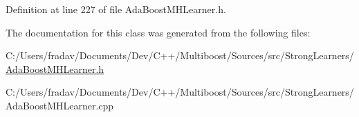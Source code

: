 Definition at line 227 of file Ada\-Boost\-M\-H\-Learner.\-h.



The documentation for this class was generated from the following files\-:\begin{DoxyCompactItemize}
\item 
C\-:/\-Users/fradav/\-Documents/\-Dev/\-C++/\-Multiboost/\-Sources/src/\-Strong\-Learners/\hyperlink{AdaBoostMHLearner_8h}{Ada\-Boost\-M\-H\-Learner.\-h}\item 
C\-:/\-Users/fradav/\-Documents/\-Dev/\-C++/\-Multiboost/\-Sources/src/\-Strong\-Learners/Ada\-Boost\-M\-H\-Learner.\-cpp\end{DoxyCompactItemize}
